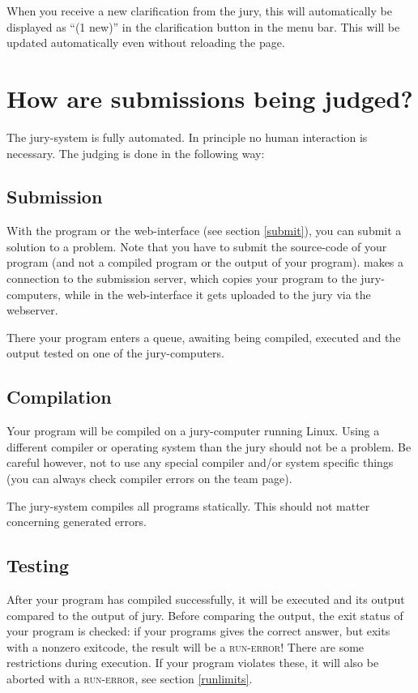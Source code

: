 When you receive a new clarification from the jury, this will
automatically be displayed as ``(1 new)'' in the clarification button
in the menu bar. This will be updated automatically even without reloading
the page.

\section{How are submissions being judged?}

The \DOMjudge jury-system is fully automated. In principle no human
interaction is necessary. The judging is done in the following way:

\subsection{Submission}

With the  program or the web-interface (see section
\ref{submit}), you can submit a solution to a problem. Note that you
have to submit the source-code of your program (and not a compiled
program or the output of your program).  makes a
connection to the submission server, which copies your program to the
jury-computers, while in the web-interface it gets uploaded to the
jury via the webserver.

There your program enters a queue, awaiting being compiled, executed
and the output tested on one of the jury-computers.

\subsection{Compilation}

Your program will be compiled on a jury-computer running Linux.
Using a different compiler or operating system than the jury should
not be a problem. Be careful however, not to use any special compiler
and/or system specific things (you can always check compiler errors on
the team page).

The jury-system compiles all programs statically. This should not
matter concerning generated errors.

\subsection{Testing}

After your program has compiled successfully, it will be executed and
its output compared to the output of jury. Before comparing the
output, the exit status of your program is checked: if your programs
gives the correct answer, but exits with a nonzero exitcode, the
result will be a \textsc{run-error}! There are some restrictions during
execution. If your program violates these, it will also be aborted
with a \textsc{run-error}, see section \ref{runlimits}.

